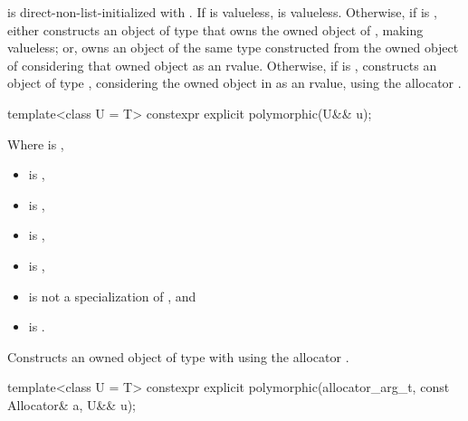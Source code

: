 \begin{itemdescr}
\pnum
\effects
{} is direct-non-list-initialized with .
If  is valueless,  is valueless.
Otherwise,
if  is ,
either constructs an object of type  that
owns the owned object of ,
making  valueless; or,
owns an object of the same type constructed from
the owned object of 
considering that owned object as an rvalue.
Otherwise,
if  is ,
constructs an object of type ,
considering the owned object in  as an rvalue,
using the allocator .
\end{itemdescr}

%
\begin{itemdecl}
template<class U = T>
  constexpr explicit polymorphic(U&& u);
\end{itemdecl}

\begin{itemdescr}
\pnum
\constraints
Where  is ,
\begin{itemize}
\item
{} is ,
\item
{} is ,
\item
{} is ,
\item
{} is ,
\item
{} is not a specialization of , and
\item
{} is .
\end{itemize}

\pnum
\effects
Constructs an owned object of type  with 
using the allocator .
\end{itemdescr}

%
\begin{itemdecl}
template<class U = T>
  constexpr explicit polymorphic(allocator_arg_t, const Allocator& a, U&& u);
\end{itemdecl}

